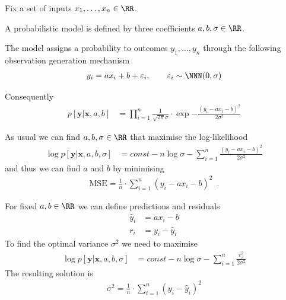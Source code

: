 \documentclass[landscape,footrule]{foils}
\renewcommand{\vec}[1]{\boldsymbol{#1}}
\begin{document}

\begin{triangles}
\item Fix a set of inputs $x_1, \ldots, x_n\in \RR$. 
\item A probabilistic model is defined by three coefficients $a, b,\sigma\in\RR$.
\item The model assigns a probability to outcomes $y_1,\ldots, y_n$ through the following observation generation mechanism
\begin{align*}
  y_i=ax_i+b+\varepsilon_i,\qquad \varepsilon_i\sim\NNN(0,\sigma)
\end{align*}
\item Consequently 
\begin{align*}
  p[\vec{y}|\vec{x},a,b]&=\prod_{i=1}^n\frac{1}{\sqrt{2\pi}
    \sigma}\cdot\exp{-\frac{(y_i-ax_i-b)^2}{2\sigma^2}}
\end{align*}
\end{triangles}


As usual we can find  $a,b,\sigma\in\RR$ that maximise the log-likelihood
\begin{align*}
\log p[\vec{y}|\vec{x},a,b,\sigma]&= const -n\log \sigma-\sum_{i=1}^n\frac{(y_i-ax_i-b)^2}{2\sigma^2}
\end{align*}
and thus we can find $a$ and $b$ by minimising 
\begin{align*}
\text{MSE}=\frac{1}{n}\cdot \sum_{i=1}^n(y_i-ax_i-b)^2\enspace.
\end{align*}



For fixed $a, b\in\RR$ we can define predictions and residuals 
\begin{align*}
\hat{y}_i&= ax_i-b\\
r_i&=y_i-\hat{y}_i
\end{align*}
To find the optimal variance $\sigma^2$ we need to maximise
\begin{align*}
\log p[\vec{y}|\vec{x},a,b,\sigma]&= const -n\log \sigma-\sum_{i=1}^n\frac{r_i^2}{2\sigma^2}
\end{align*}
The resulting solution is 
\begin{align*}
\sigma^2=\frac{1}{n}\cdot \sum_{i=1}^n (y_i-\hat{y}_i)^2
\end{align*}



\end{document}
